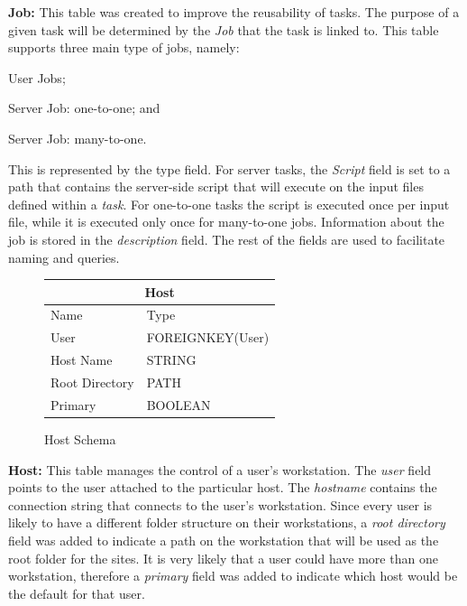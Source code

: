 \noindent\textbf{Job:} This table was created to improve the reusability of tasks.
The purpose of a given task will be determined by the \emph{Job} that the task
is linked to. This table supports three main type of jobs, namely:
\begin{inparaenum}[(i)] \item User Jobs; \item Server Job: one-to-one; and \item
Server Job: many-to-one.\end{inparaenum} This is represented by the type field.
For server tasks, the \emph{Script} field is set to a path that contains the
server-side script that will execute on the input files defined within a \emph{task}.
For one-to-one tasks  the script is executed once per input file, while it
is executed only once for many-to-one jobs. Information about the job is stored
in the \emph{description} field. The rest of the fields are used to facilitate
naming and queries.
\\
\begin{figure}
\begin{tabular}{l|l}
    \multicolumn{2}{c}{Host} \\
    \hline
    Name        & Type \\
    \hline
    User        & FOREIGNKEY(User)  \\
    Host Name   & STRING  \\
    Root Directory & PATH \\
    Primary      & BOOLEAN \\
\end{tabular}
\caption{Host Schema}
\end{figure}

\noindent\textbf{Host:} This table manages the control of a user's workstation.
The \emph{user} field points to the user attached to the particular host. The
\emph{hostname} contains the connection string that connects to the user's workstation.
Since every user is likely to have a different folder structure on their workstations,
a \emph{root directory} field was added to indicate a path on the workstation that
will be used as the root folder for the sites. It is very likely that a user could
have more than one workstation, therefore a \emph{primary} field was added to indicate
which host would be the default for that user.
\\

